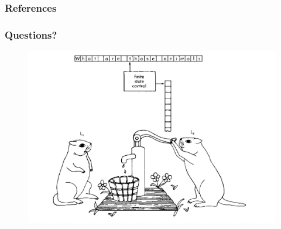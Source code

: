 \documentclass[11 pt]{beamer}
\begin{document}
\begin{frame}[shrink]
	\frametitle{References}
	
	\nocite{*}
	
\end{frame}


\begin{frame}[fragile]
	\frametitle{Questions?}
	\begin{figure}[H]
		\includegraphics[width = \textwidth]{../images/pumping_lemmings.png}
	\end{figure}
\end{frame}
\end{document}
